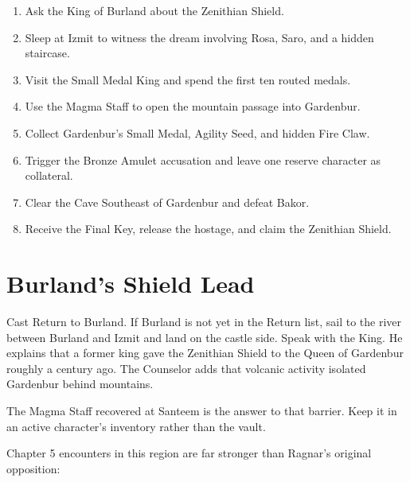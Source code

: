 \documentclass[
  american,
  10pt,
  letterpaper,
  oneside,
  open=any]{scrreprt}
\providecommand{\tightlist}{%
  \setlength{\itemsep}{0pt}\setlength{\parskip}{0pt}}
\begin{document}
\begin{enumerate}
\def\labelenumi{\arabic{enumi}.}
\tightlist
\item
  Ask the King of Burland about the Zenithian Shield.
\item
  Sleep at Izmit to witness the dream involving Rosa, Saro, and a hidden
  staircase.
\item
  Visit the Small Medal King and spend the first ten routed medals.
\item
  Use the Magma Staff to open the mountain passage into Gardenbur.
\item
  Collect Gardenbur's Small Medal, Agility Seed, and hidden Fire Claw.
\item
  Trigger the Bronze Amulet accusation and leave one reserve character
  as collateral.
\item
  Clear the Cave Southeast of Gardenbur and defeat Bakor.
\item
  Receive the Final Key, release the hostage, and claim the Zenithian
  Shield.
\end{enumerate}

\section{Burland's Shield Lead}\label{burlands-shield-lead}

Cast Return to Burland. If Burland is not yet in the Return list, sail
to the river between Burland and Izmit and land on the castle side.
Speak with the King. He explains that a former king gave the Zenithian
Shield to the Queen of Gardenbur roughly a century ago. The Counselor
adds that volcanic activity isolated Gardenbur behind mountains.

The Magma Staff recovered at Santeem is the answer to that barrier. Keep
it in an active character's inventory rather than the vault.

Chapter 5 encounters in this region are far stronger than Ragnar's
original opposition:
\end{document}
